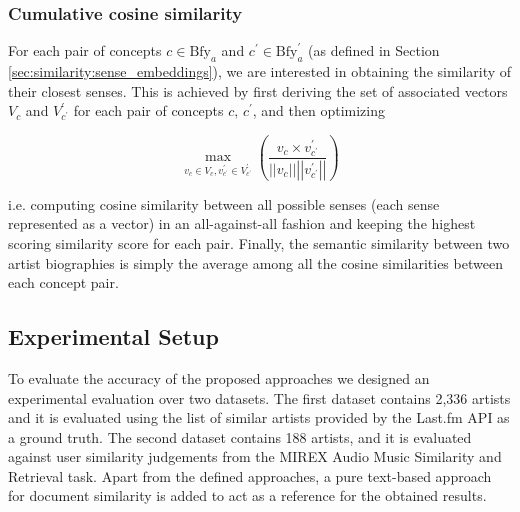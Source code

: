 \subsubsection{Cumulative cosine similarity} %

For each pair of concepts $c \in \text{Bfy}_{a}$ and $c^{\prime} \in \text{Bfy}^{\prime}_{a}$ (as defined in Section \ref{sec:similarity:sense_embeddings}), we are interested in obtaining the similarity of their closest senses. This is achieved by first deriving the set of associated vectors $V_c$ and $V_{c^{\prime}}^{\prime}$ for each pair of concepts $c,\,c^{\prime}$, and then optimizing

\begin{equation}
\operatorname{max}_{v_c \in V_c , v_{c^{\prime}}^{\prime} \in V_{c^{\prime}}^{\prime}}
\left( \frac{v_c \times v_{c^{\prime}}^{\prime}}{\left\vert\left\vert{v_c}\right\vert\right\vert \left\vert\left\vert{v_{c^{\prime}}^{\prime}}\right\vert\right\vert } \right)
\end{equation}

i.e. computing cosine similarity between all possible senses (each sense represented as a vector) in an all-against-all fashion and keeping the highest scoring similarity score for each pair. Finally, the semantic similarity between two artist biographies is simply the average among all the cosine similarities between each concept pair.

\subsection{Experimental Setup}
\label{sec:similarity:experimentalsetup}

To evaluate the accuracy of the proposed approaches we designed an experimental evaluation over two datasets. The first dataset contains 2,336 artists and it is evaluated using the list of similar artists provided by the Last.fm API as a ground truth. The second dataset contains 188 artists, and it is evaluated against user similarity judgements from the MIREX Audio Music Similarity and Retrieval task.
Apart from the defined approaches, a pure text-based approach for document similarity is added to act as a reference for the obtained results.

